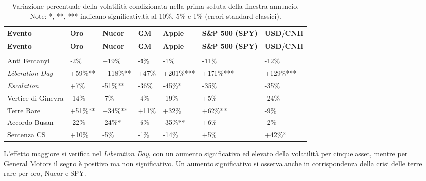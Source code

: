 {
\footnotesize
\begin{longtable}{ p{} p{} p{} p{} p{} p{} p{} }
    \toprule
    \textbf{Evento} & \textbf{Oro} & \textbf{Nucor} & \textbf{GM} & \textbf{Apple} & \textbf{S\&P 500 (SPY)} & \textbf{USD/\newline CNH} \\
    \midrule
    \endfirsthead
    \toprule
    \textbf{Evento} & \textbf{Oro} & \textbf{Nucor} & \textbf{GM} & \textbf{Apple} & \textbf{S\&P 500 (SPY)} & \textbf{USD/\newline CNH} \\
    \midrule
    \endhead
    \midrule
    \noalign{\vspace{10pt}}
    \caption[]{Variazione percentuale della volatilità condizionata.} \\
    \endfoot
    \bottomrule
    \noalign{\vspace{10pt}}
    \caption[Variazione percentuale della volatilità condizionata nella prima seduta della finestra annuncio.]{Variazione percentuale della volatilità condizionata nella prima seduta della finestra annuncio. \newline Note: *, **, *** indicano significatività al 10\%, 5\% e 1\% (errori standard classici).}
    \label{tab:var-volatilita}
    \endlastfoot
    Anti Fentanyl & -2\% & +19\% & -6\% & -1\% & -11\% & -12\% \\ \midrule
    \emph{Liberation Day} & +59\%** & +118\%** & +47\% & +201\%*** & +171\%*** & +129\%*** \\ \midrule
    \emph{Escalation} & +7\% & -51\%** & -36\% & -45\%* & -35\% & -35\% \\ \midrule
    Vertice di Ginevra & -14\% & -7\% & -4\% & -19\% & +5\% & -24\% \\ \midrule
    Terre Rare & +51\%** & +34\%** & +11\% & +32\% & +62\%** & -9\% \\ \midrule
    Accordo Busan & -22\% & -24\%* & -6\% & -35\%** & +6\% & -2\% \\ \midrule
    Sentenza CS & +10\% & -5\% & -1\% & -14\% & +5\% & +42\%* \\
\end{longtable}
}

L'effetto maggiore si verifica nel \emph{Liberation Day}, con un aumento significativo ed elevato della volatilità per cinque asset, mentre per General Motors il segno è positivo 
ma non significativo. Un aumento significativo si osserva anche in corrispondenza della crisi delle terre rare per oro, Nucor e SPY.

